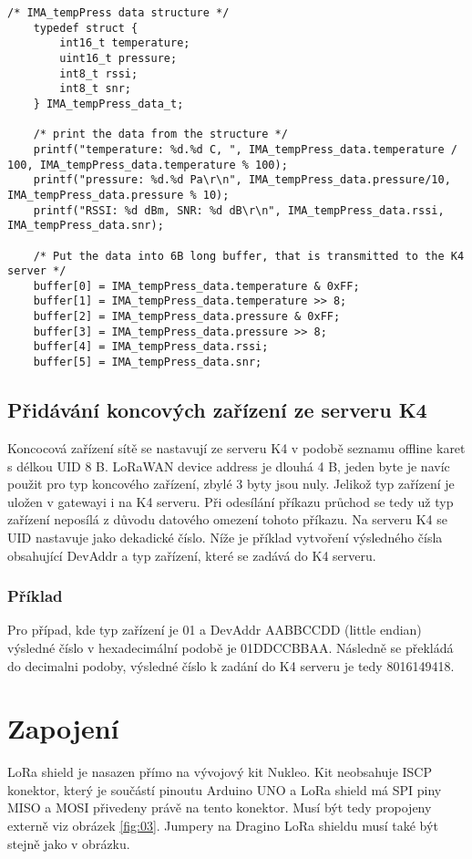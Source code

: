 \begin{lstlisting}[style=CStyle]
    /* IMA_tempPress data structure */   
    typedef struct {
        int16_t temperature;
        uint16_t pressure;
        int8_t rssi;
        int8_t snr;
    } IMA_tempPress_data_t;
    
    /* print the data from the structure */
	printf("temperature: %d.%d C, ", IMA_tempPress_data.temperature / 100, IMA_tempPress_data.temperature % 100);
	printf("pressure: %d.%d Pa\r\n", IMA_tempPress_data.pressure/10, IMA_tempPress_data.pressure % 10);
	printf("RSSI: %d dBm, SNR: %d dB\r\n", IMA_tempPress_data.rssi, IMA_tempPress_data.snr);

    /* Put the data into 6B long buffer, that is transmitted to the K4 server */
	buffer[0] = IMA_tempPress_data.temperature & 0xFF;
	buffer[1] = IMA_tempPress_data.temperature >> 8;
	buffer[2] = IMA_tempPress_data.pressure & 0xFF;
	buffer[3] = IMA_tempPress_data.pressure >> 8;
	buffer[4] = IMA_tempPress_data.rssi;
	buffer[5] = IMA_tempPress_data.snr;
\end{lstlisting}


\subsection{Přidávání koncových zařízení ze serveru K4}
Koncocová zařízení sítě se nastavují ze serveru K4 v podobě seznamu offline karet s délkou UID 8 B.
LoRaWAN device address je dlouhá 4 B, jeden byte je navíc použit pro typ koncového zařízení, zbylé 3 byty jsou nuly.
Jelikož typ zařízení je uložen v gatewayi i na K4 serveru. Při odesílání příkazu průchod se tedy už typ zařízení neposílá z důvodu datového omezení tohoto příkazu.
Na serveru K4 se UID nastavuje jako dekadické číslo.
Níže je příklad vytvoření výsledného čísla obsahující DevAddr a typ zařízení, které se zadává do K4 serveru.

\subsubsection{Příklad}
Pro případ, kde typ zařízení je 01 a DevAddr AABBCCDD (little endian) výsledné číslo v hexadecimální podobě je 01DDCCBBAA. Následně se překládá do decimalni podoby, výsledné číslo k zadání do K4 serveru je tedy 8016149418.


\newpage
\section{Zapojení}
LoRa shield \cite{draginoWiki} je nasazen přímo na vývojový kit Nukleo. Kit neobsahuje ISCP konektor, který je součástí pinoutu Arduino UNO a LoRa shield má SPI piny MISO a MOSI přivedeny právě na tento konektor. Musí být tedy propojeny externě viz obrázek \ref{fig:03}. Jumpery na Dragino LoRa shieldu musí také být stejně jako v obrázku.

